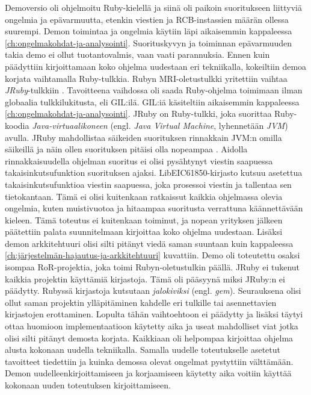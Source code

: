 Demoversio oli ohjelmoitu Ruby-kielellä ja siinä oli paikoin suoritukseen liittyviä ongelmia ja epävarmuutta, etenkin viestien ja RCB-instassien määrän ollessa suurempi. Demon toimintaa ja ongelmia käytiin läpi aikaisemmin kappaleessa \ref{ch:ongelmakohdat-ja-analysointi}. Suorituskyvyn ja toiminnan epävarmuuden takia demo ei ollut tuotantovalmis, vaan vaati parannuksia. Ennen kuin päädyttiin kirjoittamaan koko ohjelma uudestaan eri tekniikalla, kokeiltiin demoa korjata vaihtamalla Ruby-tulkkia. Rubyn MRI-oletustulkki yritettiin vaihtaa \emph{JRuby}-tulkkiin \cite{jruby-homepage}. Tavoitteena vaihdossa oli saada Ruby-ohjelma toimimaan ilman globaalia tulkkilukitusta, eli GIL:ilä. GIL:iä käsiteltiin aikaisemmin kappaleessa \ref{ch:ongelmakohdat-ja-analysointi}. JRuby on Ruby-tulkki, joka suorittaa Ruby-koodia \emph{Java-virtuaalikoneen} (engl. \emph{Java Virtual Machine}, lyhennetään \emph{JVM}) avulla. JRuby mahdollistaa säikeiden suorituksen rinnakkain JVM:n omilla säikeillä ja näin ollen suorituksen pitäisi olla nopeampaa \mbox{\cite{Youssef2013}}. Aidolla rinnakkaisuudella ohjelman suoritus ei olisi pysähtynyt viestin saapuessa takaisinkutsufunktion suorituksen ajaksi. LibEIC61850-kirjasto kutsuu asetettua takaisinkutsufunktioa viestin saapuessa, joka prosessoi viestin ja tallentaa sen tietokantaan. Tämä ei olisi kuitenkaan ratkaissut kaikkia ohjelmassa olevia ongelmia, kuten muistivuotoa ja hitaampaa suoritusta verrattuna käännettävään kieleen. Tämä toteutus ei kuitenkaan toiminut, ja nopean yrityksen jälkeen päätettiin palata suunnitelmaan kirjoittaa koko ohjelma uudestaan. Lisäksi demon arkkitehtuuri olisi silti pitänyt viedä saman suuntaan kuin kappaleessa \ref{ch:järjestelmän-hajautus-ja-arkkitehtuuri} kuvattiin. Demo oli toteutettu osaksi isompaa RoR-projektia, joka toimi Rubyn-oletustulkin päällä. JRuby ei tukenut kaikkia projektin käyttämiä kirjastoja. Tämä oli pääsyynä miksi JRuby:n ei päädytty. Rubyssä kirjastoja kutsutaan \emph{jalokiviksi} (engl. \emph{gem}). Seurauksena olisi ollut saman projektin ylläpitäminen kahdelle eri tulkille tai asennettavien kirjastojen erottaminen. Lopulta tähän vaihtoehtoon ei päädytty ja lisäksi täytyi ottaa huomioon implementaatioon käytetty aika ja useat mahdolliset viat jotka olisi silti pitänyt demosta korjata. Kaikkiaan oli helpompaa kirjoittaa ohjelma alusta kokonaan uudella tekniikalla. Samalla uudelle toteutukselle asetetut tavoitteet tiedettiin ja kuinka demossa olevat ongelmat pystyttiin välttämään. Demon uudelleenkirjoittamiseen ja korjaamiseen käytetty aika voitiin käyttää kokonaan uuden toteutuksen kirjoittamiseen.

